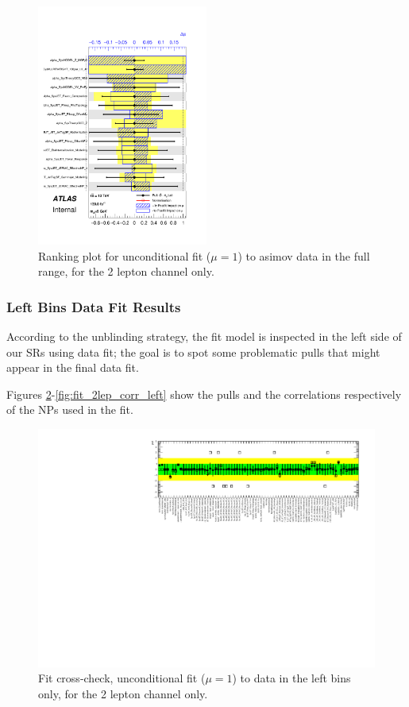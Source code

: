 \begin{figure}[ht]
      \centering
        \includegraphics[width=0.5\textwidth]{figures/2lep/FitResults/pulls_mu_SemileptonicVBS_5_AsimovAllbins.pdf}
        \caption{Ranking plot for unconditional fit ($\mu=1$) to asimov data in the full range, for the 2 lepton channel only.}
       \label{fig:fit_2lep_ranking_all}
\end{figure}

\subsubsection{Left Bins Data Fit Results}

According to the unblinding strategy, the fit model is inspected in the left side of our SRs using data fit;
the goal is to spot some problematic pulls that might appear in the final data fit.

Figures \ref{fig:fit_2lep_fcc_left}-\ref{fig:fit_2lep_corr_left}
show the pulls and the correlations respectively of the NPs used in the fit.

\begin{figure}[ht]
      \centering
        \includegraphics[width=\linewidth]{figures/2lep/FitResults/NP_allExceptGammas_DataLeftBins.pdf}
        \caption{Fit cross-check, unconditional fit ($\mu=1$) to data in the left bins only, for the 2 lepton channel only.}
       \label{fig:fit_2lep_fcc_left}
\end{figure}

